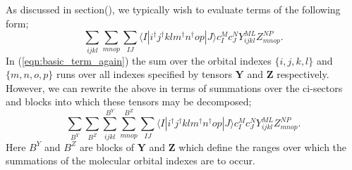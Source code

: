 \documentclass[12pt]{article}
\begin{document}
\noindent As discussed in section(), we typically wish to evaluate terms of the
following form;
\begin{equation}
\sum_{ijkl}\sum_{mnop} \sum_{IJ} \langle I | i^{\dagger}j^{\dagger}klm^{\dagger}n^{\dagger}op | J \rangle c^{M}_{I} c_{J}^{N} Y^{ML}_{ijkl}Z^{NP}_{mnop}.
\label{eqn:basic_term_again}
\end{equation}
\noindent In (\ref{eqn:basic_term_again}) the sum over the orbital indexes
$\{i,j,k,l\}$ and  $\{m,n,o,p\}$ runs over all indexes specified by tensors
$\mathbf{Y}$ and $\mathbf{Z}$ respectively. However, we can rewrite the above
in terms of summations over the ci-sectors and blocks into which these tensors may be
decomposed;
\begin{equation}
\sum_{B^{Y}}\sum_{B^{Z}}
\sum^{B^{Y}}_{ijkl}\sum^{B^{Z}}_{mnop} \sum_{IJ} \langle I | i^{\dagger}j^{\dagger}klm^{\dagger}n^{\dagger}op | J \rangle c^{M}_{I} c_{J}^{N} Y^{ML}_{ijkl}Z^{NP}_{mnop}.
\label{eqn:basic_term_block_wise}
\end{equation}
\noindent Here $B^{Y}$ and $B^{Z}$ are blocks of $\mathbf{Y}$ and $\mathbf{Z}$
which define the ranges over which the summations of the molecular orbital
indexes are to occur.\\
\end{document}
